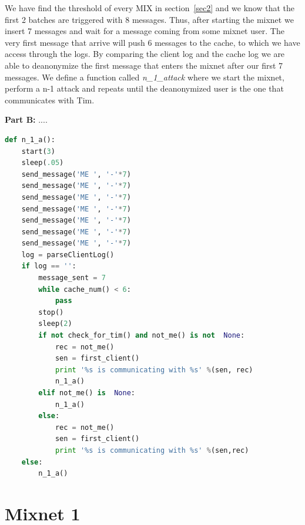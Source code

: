 \documentclass[preprint,12pt,3p]{elsarticle}
\begin{document}
We have find the threshold of every MIX in section~\ref{sec2} and we know that the first 2 batches are triggered with 8 messages. Thus, after starting the mixnet we insert 7 messages and wait for a message coming from some mixnet user. The very first message that arrive will push 6 messages to the cache, to which we have access through the logs. By comparing the client log and the cache log we are able to deanonymize the first message that enters the mixnet after our first 7 messages. We define a function called \textit{n\_1\_attack} where we start the mixnet, perform a n-1 attack and repeats until the deanonymized user is the one that communicates with Tim.




\textbf{Part B:}
....
\newline


\appendix



\begin{lstlisting}[language=Python]
def n_1_a():
    start(3)
    sleep(.05)
    send_message('ME ', '-'*7)
    send_message('ME ', '-'*7)
    send_message('ME ', '-'*7)
    send_message('ME ', '-'*7)
    send_message('ME ', '-'*7)
    send_message('ME ', '-'*7)
    send_message('ME ', '-'*7)
    log = parseClientLog()
    if log == '':
        message_sent = 7
        while cache_num() < 6:
            pass
        stop()
        sleep(2)
        if not check_for_tim() and not_me() is not  None:
            rec = not_me()
            sen = first_client()
            print '%s is communicating with %s' %(sen, rec)
            n_1_a()
        elif not_me() is  None:
            n_1_a()
        else:
            rec = not_me()
            sen = first_client()
            print '%s is communicating with %s' %(sen,rec)
    else:
        n_1_a()
\end{lstlisting}

\section{Mixnet 1}
\end{document}
